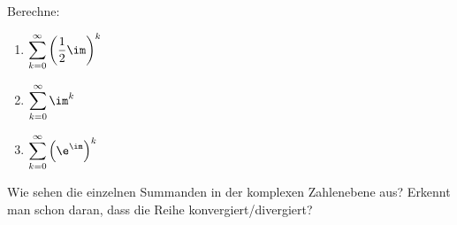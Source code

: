 \begin{exercise}
  Berechne:
  \begin{enumerate}[label=(\alph*)]
  \item $\displaystyle \sum_{k=0}^{\infty} \left( \frac{1}{2} \im \right)^k$
  \item $\displaystyle \sum_{k=0}^{\infty} \im^k$
  \item $\displaystyle \sum_{k=0}^{\infty} \left( \e^{\im} \right)^k$
  \end{enumerate}
  Wie sehen die einzelnen Summanden in der komplexen Zahlenebene aus? Erkennt
  man schon daran, dass die Reihe konvergiert/divergiert?
\end{exercise}
